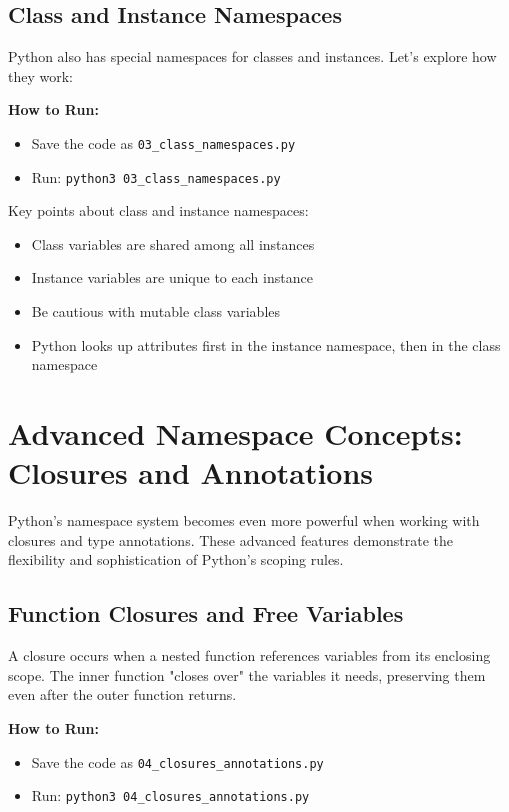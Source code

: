 \subsection{Class and Instance Namespaces}

Python also has special namespaces for classes and instances. Let's explore how they work:

\textbf{How to Run:}
\begin{itemize}
    \item Save the code as \verb|03_class_namespaces.py|
    \item Run: \verb|python3 03_class_namespaces.py|
\end{itemize}

\begin{macterminal}
    
\end{macterminal}

Key points about class and instance namespaces:
\begin{itemize}
    \item Class variables are shared among all instances
    \item Instance variables are unique to each instance
    \item Be cautious with mutable class variables
    \item Python looks up attributes first in the instance namespace, then in the class namespace
\end{itemize}

\section{Advanced Namespace Concepts: Closures and Annotations}

Python's namespace system becomes even more powerful when working with closures and type annotations. These advanced features demonstrate the flexibility and sophistication of Python's scoping rules.

\subsection{Function Closures and Free Variables}

A closure occurs when a nested function references variables from its enclosing scope. The inner function "closes over" the variables it needs, preserving them even after the outer function returns.

\textbf{How to Run:}
\begin{itemize}
    \item Save the code as \verb|04_closures_annotations.py|
    \item Run: \verb|python3 04_closures_annotations.py|
\end{itemize}

